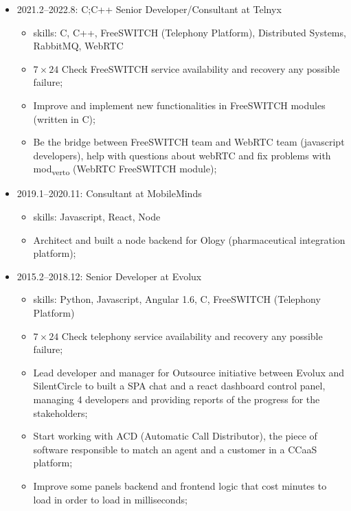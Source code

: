 \documentclass[
]{article}
\providecommand{\tightlist}{%
  \setlength{\itemsep}{0pt}\setlength{\parskip}{0pt}}
\begin{document}
\vspace{2mm}

\begin{itemize}
\tightlist
\item
  2021.2--2022.8: C;C++ Senior Developer/Consultant at Telnyx

  \begin{itemize}
  \tightlist
  \item
    skills: C, C++, FreeSWITCH (Telephony Platform), Distributed
    Systems, RabbitMQ, WebRTC
  \item
    \(7 \times 24\) Check FreeSWITCH service availability and recovery
    any possible failure;
  \item
    Improve and implement new functionalities in FreeSWITCH modules
    (written in C);
  \item
    Be the bridge between FreeSWITCH team and WebRTC team (javascript
    developers), help with questions about webRTC and fix problems with
    mod\textsubscript{verto} (WebRTC FreeSWITCH module);
  \end{itemize}
\end{itemize}

\vspace{2mm}

\begin{itemize}
\tightlist
\item
  2019.1--2020.11: Consultant at MobileMinds

  \begin{itemize}
  \tightlist
  \item
    skills: Javascript, React, Node
  \item
    Architect and built a node backend for Ology (pharmaceutical
    integration platform);
  \end{itemize}
\end{itemize}

\vspace{2mm}

\begin{itemize}
\tightlist
\item
  2015.2--2018.12: Senior Developer at Evolux

  \begin{itemize}
  \tightlist
  \item
    skills: Python, Javascript, Angular 1.6, C, FreeSWITCH (Telephony
    Platform)
  \item
    \(7 \times 24\) Check telephony service availability and recovery
    any possible failure;
  \item
    Lead developer and manager for Outsource initiative between Evolux
    and SilentCircle to built a SPA chat and a react dashboard control
    panel, managing 4 developers and providing reports of the progress
    for the stakeholders;
  \item
    Start working with ACD (Automatic Call Distributor), the piece of
    software responsible to match an agent and a customer in a CCaaS
    platform;
  \item
    Improve some panels backend and frontend logic that cost minutes to
    load in order to load in milliseconds;
  \end{itemize}
\end{itemize}
\end{document}
